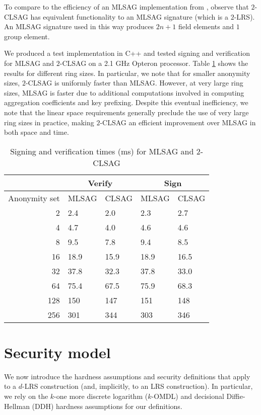 \documentclass[draft]{llncs} %
\begin{document}
To compare to the efficiency of an MLSAG implementation from \cite{noether}, observe that $2$-CLSAG has equivalent functionality to an MLSAG signature (which is a $2$-LRS). An MLSAG signature used in this way produces $2n+1$ field elements and $1$ group element.

We produced a test implementation in C++ and tested signing and verification for MLSAG and $2$-CLSAG on a 2.1 GHz Opteron processor. Table \ref{table:timing} shows the results for different ring sizes. In particular, we note that for smaller anonymity sizes, $2$-CLSAG is uniformly faster than MLSAG. However, at very large ring sizes, MLSAG is faster due to additional computations involved in computing aggregation coefficients and key prefixing. Despite this eventual inefficiency, we note that the linear space requirements generally preclude the use of very large ring sizes in practice, making $2$-CLSAG an efficient improvement over MLSAG in both space and time.

\begin{table}[htp]
\begin{center}
\begin{tabular}{r|ll|ll}
& \multicolumn{2}{c|}{Verify} & \multicolumn{2}{c}{Sign} \\
\hline
Anonymity set & MLSAG & CLSAG & MLSAG & CLSAG \\
\hline
2 & 2.4 & 2.0 & 2.3 & 2.7 \\
4 & 4.7 & 4.0 & 4.6 & 4.6 \\
8 & 9.5 & 7.8 & 9.4 & 8.5 \\
16 & 18.9 & 15.9 & 18.9 & 16.5 \\
32 & 37.8 & 32.3 & 37.8 & 33.0 \\
64 & 75.4 & 67.5 & 75.9 & 68.3 \\
128 & 150 & 147 & 151 & 148 \\
256 & 301 & 344 & 303 & 346
\end{tabular}
\end{center}
\caption{Signing and verification times (ms) for MLSAG and $2$-CLSAG}
\label{table:timing}
\end{table}


\section{Security model}\label{sec:security}
We now introduce the hardness assumptions and security definitions that apply to a $d$-LRS construction (and, implicitly, to an LRS construction). In particular, we rely on the $k$-one more discrete logarithm ($k$-OMDL) and decisional Diffie-Hellman (DDH) hardness assumptions for our definitions.
\end{document}
